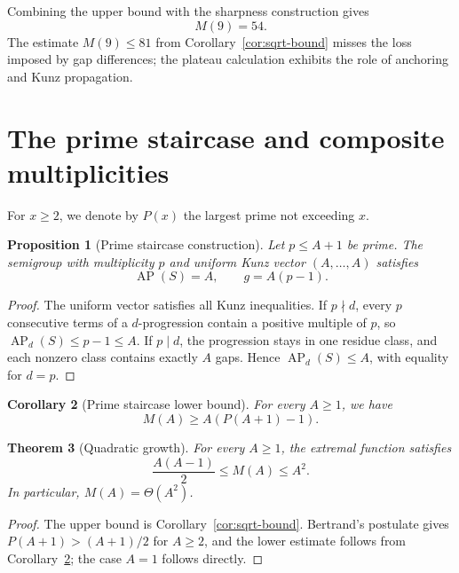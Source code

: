 \documentclass[11pt]{article}
\theoremstyle{plain}
\newtheorem{theorem}{Theorem}[section]
\newtheorem{proposition}[theorem]{Proposition}
\newtheorem{corollary}[theorem]{Corollary}
\theoremstyle{definition}
\theoremstyle{remark}
\newcommand{\AP}{\operatorname{AP}}
\begin{document}
Combining the upper bound with the sharpness construction gives
\begin{equation}\label{eq:M9}
  \boxed{M(9)=54.}
\end{equation}
The estimate $M(9)\leq81$ from Corollary~\ref{cor:sqrt-bound} misses the
loss imposed by gap differences; the plateau calculation exhibits the role
of anchoring and Kunz propagation.

\section{The prime staircase and composite multiplicities}
\label{sec:prime-staircase}

For $x\geq2$, we denote by $P(x)$ the largest prime not exceeding $x$.

\begin{proposition}[Prime staircase construction]
\label{prop:prime-staircase}
Let $p\leq A+1$ be prime.  The semigroup with multiplicity $p$ and uniform
Kunz vector $(A,\ldots,A)$ satisfies
\[
  \AP(S)=A,
  \qquad g=A(p-1).
\]
\end{proposition}

\begin{proof}
The uniform vector satisfies all Kunz inequalities.  If $p\nmid d$, every
$p$ consecutive terms of a $d$-progression contain a positive multiple of
$p$, so $\AP_d(S)\leq p-1\leq A$.  If $p\mid d$, the progression stays in
one residue class, and each nonzero class contains exactly $A$ gaps.  Hence
$\AP_d(S)\leq A$, with equality for $d=p$.
\end{proof}

\begin{corollary}[Prime staircase lower bound]
\label{cor:prime-staircase-lower}
For every $A\geq1$, we have
\[
  \boxed{M(A)\geq A(P(A+1)-1).}
\]
\end{corollary}

\begin{theorem}[Quadratic growth]\label{thm:quadratic-growth}
For every $A\geq1$, the extremal function satisfies
\[
  \frac{A(A-1)}2\leq M(A)\leq A^2.
\]
In particular, $M(A)=\Theta(A^2)$.
\end{theorem}

\begin{proof}
The upper bound is Corollary~\ref{cor:sqrt-bound}.  Bertrand's postulate
gives $P(A+1)>(A+1)/2$ for $A\geq2$, and the lower estimate follows from
Corollary~\ref{cor:prime-staircase-lower}; the case $A=1$ follows directly.
\end{proof}
\end{document}
